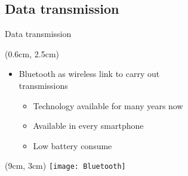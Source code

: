 \subsection{Data transmission}
\begin{frame}{Data transmission}
	
	\begin{textblock*}{10cm}(0.6cm, 2.5cm)
		\begin{itemize}
			\item<1-> Bluetooth as wireless link to carry out\\transmissions
			
			\begin{itemize}
				\item<2-> Technology available for many years now
				\item<3-> Available in every smartphone
				\item<4-> Low battery consume
			\end{itemize}
			
		\end{itemize}
	\end{textblock*}
  
  
  \begin{textblock*}{5cm}(9cm, 3cm)
   \texttt{[image: Bluetooth]}
  \end{textblock*}

\end{frame}
